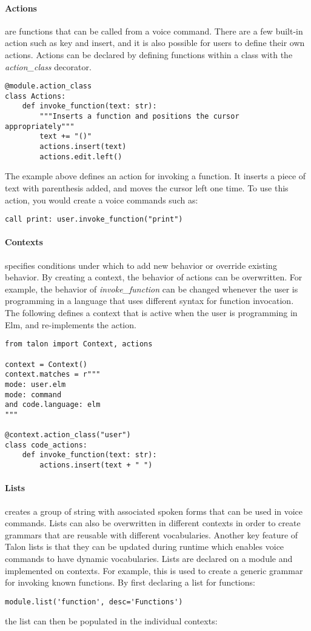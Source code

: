 \documentclass[../thesis.tex]{subfiles}
\begin{document}
\paragraph{Actions}
are functions that can be called from a voice command.
There are a few built-in action such as key and insert, and it is also possible for users to define their own actions.
Actions can be declared by defining functions within a class with the \textit{action\_class} decorator.
\begin{verbatim}
@module.action_class
class Actions:
    def invoke_function(text: str):
        """Inserts a function and positions the cursor appropriately"""
        text += "()"
        actions.insert(text)
        actions.edit.left()
\end{verbatim}
The example above defines an action for invoking a function.
It inserts a piece of text with parenthesis added, and moves the cursor left one time.
To use this action, you would create a voice commands such as:
\begin{verbatim}
call print: user.invoke_function("print") 
\end{verbatim}

\paragraph{Contexts}
specifies conditions under which to add new behavior or override existing behavior.
By creating a context, the behavior of actions can be overwritten.
For example, the behavior of \textit{invoke\_function} can be changed
whenever the user is programming in a language that uses different syntax for function invocation.
The following defines a context that is active when the user is programming in Elm,
and re-implements the action.
\begin{verbatim}
from talon import Context, actions

context = Context()
context.matches = r"""
mode: user.elm
mode: command
and code.language: elm
"""

@context.action_class("user")
class code_actions:
    def invoke_function(text: str):
        actions.insert(text + " ")
\end{verbatim}

\paragraph{Lists}
creates a group of string with associated spoken forms that can be used in voice commands.
Lists can also be overwritten in different contexts in order to create grammars that are reusable
with different vocabularies.
Another key feature of Talon lists is that they can be updated during runtime which enables voice commands to have dynamic vocabularies.
Lists are declared on a module and implemented on contexts.
For example, this is used to create a generic grammar for invoking known functions.
By first declaring a list for functions:
\begin{verbatim}
module.list('function', desc='Functions')
\end{verbatim}
the list can then be populated in the individual contexts:
\end{document}
